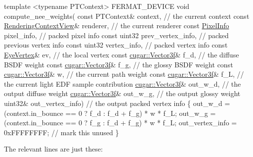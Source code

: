 \begin{DoxyCodeInclude}
    \textcolor{keyword}{template} <\textcolor{keyword}{typename} PTContext>
    FERMAT\_DEVICE
    \textcolor{keywordtype}{void} compute\_nee\_weights(
        \textcolor{keyword}{const} PTContext&            context,                \textcolor{comment}{// the current context}
        \textcolor{keyword}{const} \hyperlink{struct_rendering_context_view}{RenderingContextView}& renderer,               \textcolor{comment}{// the current renderer}
        \textcolor{keyword}{const} \hyperlink{union_pixel_info}{PixelInfo}                pixel\_info,             \textcolor{comment}{// packed pixel info}
        \textcolor{keyword}{const} uint32                prev\_vertex\_info,       \textcolor{comment}{// packed previous vertex info}
        \textcolor{keyword}{const} uint32                vertex\_info,            \textcolor{comment}{// packed vertex info}
        \textcolor{keyword}{const} \hyperlink{struct_eye_vertex}{EyeVertex}&           ev,                     \textcolor{comment}{// the local vertex}
        \textcolor{keyword}{const} \hyperlink{structcugar_1_1_vector}{cugar::Vector3f}&       f\_d,                    \textcolor{comment}{// the diffuse BSDF weight}
        \textcolor{keyword}{const} \hyperlink{structcugar_1_1_vector}{cugar::Vector3f}&       f\_g,                    \textcolor{comment}{// the glossy BSDF weight}
        \textcolor{keyword}{const} \hyperlink{structcugar_1_1_vector}{cugar::Vector3f}&       w,                      \textcolor{comment}{// the current path weight}
        \textcolor{keyword}{const} \hyperlink{structcugar_1_1_vector}{cugar::Vector3f}&       f\_L,                    \textcolor{comment}{// the current light EDF sample
       contribution}
              \hyperlink{structcugar_1_1_vector}{cugar::Vector3f}&       out\_w\_d,                \textcolor{comment}{// the output diffuse weight}
              \hyperlink{structcugar_1_1_vector}{cugar::Vector3f}&       out\_w\_g,                \textcolor{comment}{// the output glossy weight}
              uint32&               out\_vertex\_info)        \textcolor{comment}{// the output packed vertex info}
    \{
        out\_w\_d = (context.in\_bounce == 0 ? f\_d : f\_d + f\_g) * w * f\_L;
        out\_w\_g = (context.in\_bounce == 0 ? f\_g : f\_d + f\_g) * w * f\_L;
        out\_vertex\_info = 0xFFFFFFFF; \textcolor{comment}{// mark this unused}
\textcolor{comment}{}    \}
\end{DoxyCodeInclude}
 \begin{DoxyParagraph}{}
The relevant lines are just these\+:
\end{DoxyParagraph}

